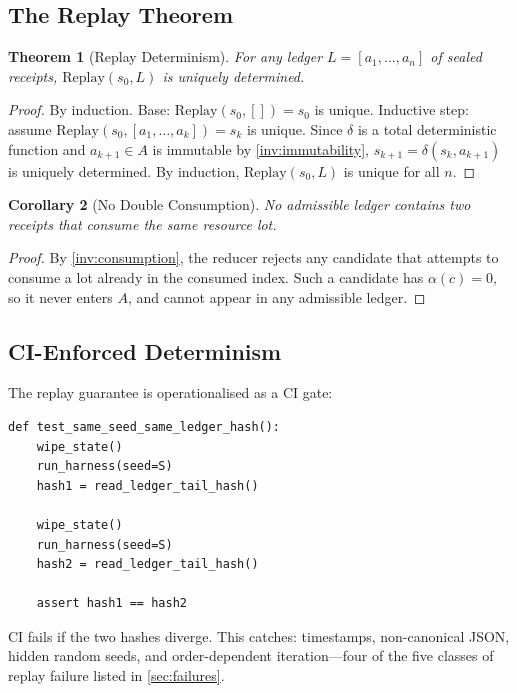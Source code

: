 \documentclass[11pt,a4paper]{article}
\theoremstyle{plain}
\newtheorem{theorem}{Theorem}[section]
\newtheorem{corollary}[theorem]{Corollary}
\theoremstyle{definition}
\theoremstyle{remark}
\newcommand{\Replay}{\mathrm{Replay}}
\begin{document}
\subsection{The Replay Theorem}

\begin{theorem}[Replay Determinism]
\label{thm:replay}
For any ledger $L = [a_1, \ldots, a_n]$ of sealed receipts,
$\Replay(s_0, L)$ is uniquely determined.
\end{theorem}

\begin{proof}
By induction.
Base: $\Replay(s_0, []) = s_0$ is unique.
Inductive step: assume $\Replay(s_0, [a_1,\ldots,a_k]) = s_k$ is unique.
Since $\delta$ is a total deterministic function and $a_{k+1} \in A$ is
immutable by \cref{inv:immutability},
$s_{k+1} = \delta(s_k, a_{k+1})$ is uniquely determined.
By induction, $\Replay(s_0, L)$ is unique for all $n$.
\end{proof}

\begin{corollary}[No Double Consumption]
\label{cor:no-double}
No admissible ledger contains two receipts that consume the same resource lot.
\end{corollary}

\begin{proof}
By \cref{inv:consumption}, the reducer rejects any candidate that attempts
to consume a lot already in the consumed index.
Such a candidate has $\alpha(c) = 0$, so it never enters $A$, and cannot
appear in any admissible ledger.
\end{proof}

\subsection{CI-Enforced Determinism}

The replay guarantee is operationalised as a CI gate:
\begin{lstlisting}[caption={CI replay test (pseudocode)}]
def test_same_seed_same_ledger_hash():
    wipe_state()
    run_harness(seed=S)
    hash1 = read_ledger_tail_hash()

    wipe_state()
    run_harness(seed=S)
    hash2 = read_ledger_tail_hash()

    assert hash1 == hash2
\end{lstlisting}

CI fails if the two hashes diverge.
This catches: timestamps, non-canonical JSON, hidden random seeds,
and order-dependent iteration---four of the five classes of replay failure
listed in \cref{sec:failures}.
\end{document}
